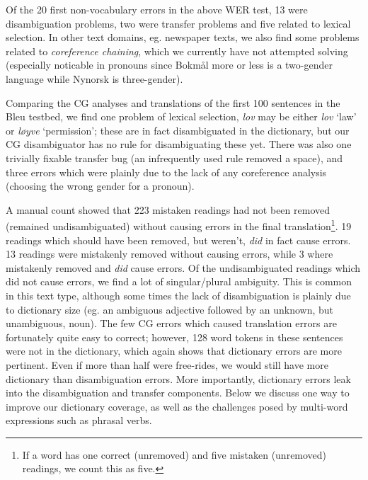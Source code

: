 \documentclass[11pt]{article}
\begin{document}
Of the 20 first non-vocabulary errors in the above WER test, 13 were
disambiguation problems, two were transfer problems and five related
to lexical selection. In other text domains, eg. newspaper texts, we
also find some problems related to \emph{coreference chaining}, which
we currently have not attempted solving (especially noticable in
pronouns since Bokmål more or less is a two-gender language while
Nynorsk is three-gender). 

Comparing the CG analyses and translations of the first 100 sentences
in the {\sc Bleu} testbed, we find one problem of lexical selection,
\emph{lov} may be either \emph{lov} `law' or \emph{løyve}
`permission'; these are in fact disambiguated in the dictionary, but
our CG disambiguator has no rule for disambiguating these yet. There
was also one trivially fixable transfer bug (an infrequently used rule
removed a space), and three errors which were plainly due to the lack
of any coreference analysis (choosing the wrong gender for a pronoun).

A manual count showed that 223 mistaken readings had not been removed
(remained undisambiguated) without causing errors in the final
translation\footnote{If a word has one correct (unremoved) and five
  mistaken (unremoved) readings, we count this as five.}. 19 readings
which should have been removed, but weren't, \emph{did} in fact cause
errors. 13 readings were mistakenly removed without causing errors,
while 3 where mistakenly removed and \emph{did} cause errors. Of the
undisambiguated readings which did not cause errors, we find a lot of
singular/plural ambiguity. This is common in this text type, although
some times the lack of disambiguation is plainly due to dictionary
size (eg. an ambiguous adjective followed by an unknown, but
unambiguous, noun). The few CG errors which caused translation errors
are fortunately quite easy to correct; however, 128 word tokens in
these sentences were not in the dictionary, which again shows that
dictionary errors are more pertinent. Even if more than half were
free-rides, we would still have more dictionary than disambiguation
errors. More importantly, dictionary errors leak into the
disambiguation and transfer components. Below we discuss one way to
improve our dictionary coverage, as well as the challenges posed by
multi-word expressions such as phrasal verbs.
\end{document}
